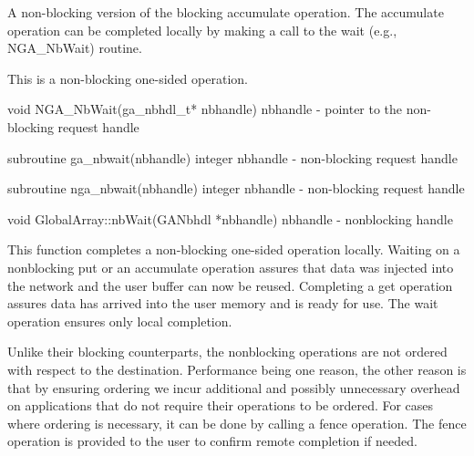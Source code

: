 \documentclass[12pt]{article}
\begin{document}
\begin{desc}

A non-blocking version of the blocking accumulate operation. The accumulate operation can be completed locally by making a call to the wait (e.g., NGA_NbWait) routine.

This is a non-blocking one-sided operation.
\end{desc}


\begin{capi}
void NGA_NbWait(ga_nbhdl_t* nbhandle)
   nbhandle   - pointer to the non-blocking request handle                    \access{[input]} 
\end{capi}

\begin{fapi}
subroutine ga_nbwait(nbhandle)
   integer nbhandle   - non-blocking request handle                           \access{[input]} 
\end{fapi}

\begin{fapi}
subroutine nga_nbwait(nbhandle)
   integer nbhandle   - non-blocking request handle                           \access{[input]} 
\end{fapi}

\begin{cxxapi}
void GlobalArray::nbWait(GANbhdl *nbhandle)
   nbhandle      - nonblocking handle                                         \access{[input]}
\end{cxxapi}

\begin{desc}

This function completes a non-blocking one-sided operation locally. Waiting on a nonblocking put or an accumulate operation assures that data was injected into the network and the user buffer can  now be reused. Completing a get operation assures data has arrived into the user memory and is ready for use. The wait operation ensures only local completion. 

Unlike their blocking counterparts, the nonblocking operations are not ordered with respect to the destination. Performance being one reason, the other reason is that by ensuring ordering we incur additional and possibly unnecessary overhead on applications that do not require their operations to be ordered. For cases where ordering is necessary, it can be done by calling a fence operation. The fence operation is provided to the user to confirm remote completion if needed.
\end{desc}
\end{document}
